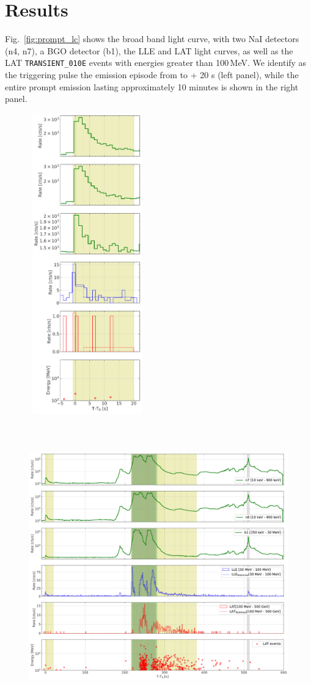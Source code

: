 \documentclass[preprint]{aastex631}
\begin{document}
\section{Results}
\label{sec:results}
Fig.~\ref{fig:prompt_lc} shows the \Fermi broad band light curve, with two NaI detectors (n4, n7), a BGO detector (b1), the LLE and LAT light curves, as well as the LAT \texttt{TRANSIENT\_010E} events with energies greater than 100\,MeV. We identify as the triggering pulse the emission episode from \trig to \trig + 20 s (left panel), while the entire prompt emission lasting approximately 10 minutes is shown in the right panel.
\begin{figure}[t]
    \centering    
    \includegraphics[width=5cm,height=13cm]{light_curve_PRECURSOR.pdf}
    \includegraphics[width=12cm,height=13cm]{light_curve_tot.pdf}

\end{figure}
\end{document}
